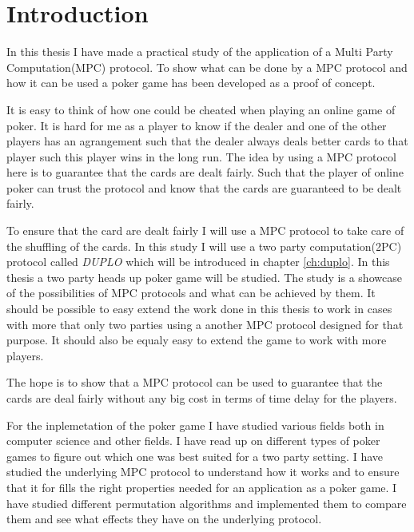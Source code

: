 \documentclass[twoside,11pt,openright]{report}
\newcommand{\DUPLO}{\textit{DUPLO} }
\begin{document}
\chapter{Introduction}
\label{ch:intro}
In this thesis I have made a practical study of the application of a Multi Party Computation(MPC) protocol. To show what can be done by a MPC protocol and how it can be used a poker game has been developed as a proof of concept.

It is easy to think of how one could be cheated when playing an online game of poker. It is hard for me as a player to know if the dealer and one of the other players has an agrangement such that the dealer always deals better cards to that player such this player wins in the long run. The idea by using a MPC protocol here is to guarantee that the cards are dealt fairly. Such that the player of online poker can trust the protocol and know that the cards are guaranteed to be dealt fairly.

To ensure that the card are dealt fairly I will use a MPC protocol to take care of the shuffling of the cards. In this study I will use a two party computation(2PC) protocol called \DUPLO which will be introduced in chapter \ref{ch:duplo}. In this thesis a two party heads up poker game will be studied. The study is a showcase of the possibilities of MPC protocols and what can be achieved by them. It should be possible to easy extend the work done in this thesis to work in cases with more that only two parties using a another MPC protocol designed for that purpose. It should also be equaly easy to extend the game to work with more players.

The hope is to show that a MPC protocol can be used to guarantee that the cards are deal fairly without any big cost in terms of time delay for the players.

\bigskip

For the inplemetation of the poker game I have studied various fields both in computer science and other fields. I have read up on different types of poker games to figure out which one was best suited for a two party setting. I have studied the underlying MPC protocol to understand how it works and to ensure that it for fills the right properties needed for an application as a poker game. I have studied different permutation algorithms and implemented them to compare them and see what effects they have on the underlying protocol.
\end{document}
